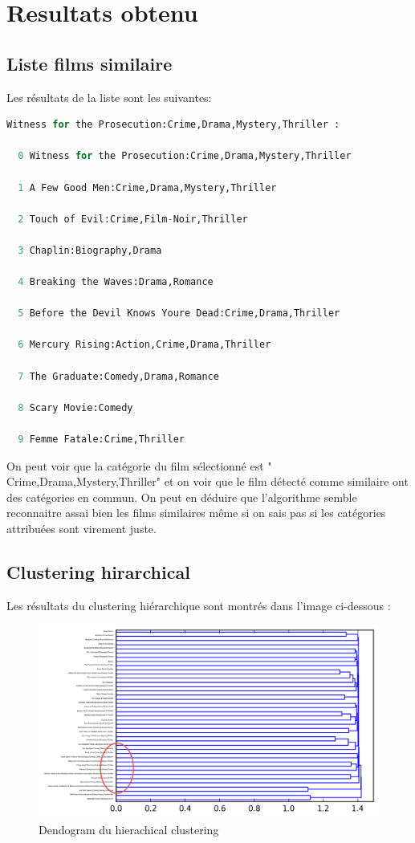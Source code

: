 \chapter{Resultats obtenu}
\section{Liste films similaire}

Les résultats de la liste sont les suivantes:

\begin{lstlisting}[language=python]
  Witness for the Prosecution:Crime,Drama,Mystery,Thriller :

  0 Witness for the Prosecution:Crime,Drama,Mystery,Thriller

  1 A Few Good Men:Crime,Drama,Mystery,Thriller

  2 Touch of Evil:Crime,Film-Noir,Thriller

  3 Chaplin:Biography,Drama

  4 Breaking the Waves:Drama,Romance

  5 Before the Devil Knows Youre Dead:Crime,Drama,Thriller

  6 Mercury Rising:Action,Crime,Drama,Thriller

  7 The Graduate:Comedy,Drama,Romance

  8 Scary Movie:Comedy

  9 Femme Fatale:Crime,Thriller
\end{lstlisting}

On peut voir que la catégorie du film sélectionné est "	Crime,Drama,Mystery,Thriller" et on voir que le film détecté comme similaire ont des catégories en commun. On peut en déduire que l'algorithme semble reconnaitre assai bien les films similaires même si on sais pas si les catégories attribuées sont virement juste. 


\section{Clustering hirarchical}

Les résultats du clustering hiérarchique sont montrés dans l'image ci-dessous :

\begin{figure}[h]
  \centering
    \includegraphics[width=0.6\linewidth]{img/clustering50_tf_idf.png}
  \caption{Dendogram du hierachical clustering}
  \label{hierarchical}
\end{figure}

